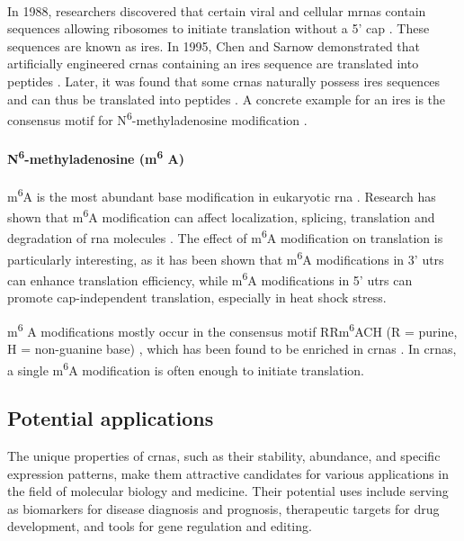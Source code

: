 \paragraph{} In 1988, researchers discovered that certain
viral and cellular \glspl{mrna} contain sequences allowing ribosomes to
initiate translation without a 5' cap \supercite{pelletier_internal_1988,
    jang_segment_1988}.
These sequences are known as \gls{ires}.
In 1995, Chen and Sarnow demonstrated that artificially engineered \glspl{crna}
containing an \gls{ires} sequence are translated into peptides
\supercite{chen_initiation_1995}.
Later, it was found that some \glspl{crna} naturally possess \gls{ires}
sequences and can thus be translated into peptides
\supercite{chen_expanding_2020,legnini_circ-znf609_2017,pamudurti_translation_2017}.
A concrete example for an \gls{ires} is the consensus motif for
N\textsuperscript{6}-methyladenosine modification
\supercite{yang_extensive_2017}.

\paragraph{N\textsuperscript{6}-methyladenosine (m\textsuperscript{6}
    A)}  m\textsuperscript{6}A is the most abundant base modification in eukaryotic
\gls{rna} \supercite{yang_extensive_2017,li_pivotal_2014,wei_methylated_1975}.
Research has shown that m\textsuperscript{6}A modification can affect
localization, splicing, translation and degradation of \gls{rna} molecules
\supercite{yue_rna_2015,meyer_dynamic_2014}.
The effect of m\textsuperscript{6}A modification on translation is particularly
interesting, as it has been shown that m\textsuperscript{6}A modifications in
3' \glspl{utr} can enhance translation
efficiency\supercite{wang_n6-methyladenosine_2015}, while m\textsuperscript{6}A
modifications in 5' \glspl{utr} can promote cap-independent translation,
especially in heat shock stress\supercite{zhou_dynamic_2015,meyer_5_2015}.

m\textsuperscript{6}
A modifications mostly occur in the consensus motif RRm\textsuperscript{6}ACH
(R = purine, H = non-guanine base)
\supercite{csepany_sequence_1990,harper_sequence_1990}, which has been found to
be enriched in \glspl{crna} \supercite{yang_extensive_2017}.
In \glspl{crna}, a single m\textsuperscript{6}A modification is often enough to
initiate translation\supercite{yang_extensive_2017}.

\subsection{Potential applications}
\label{sec:circrna_applications}
The unique properties of \glspl{crna}, such as their stability, abundance, and
specific expression patterns, make them attractive candidates for various
applications in the field of molecular biology and medicine.
Their potential uses include serving as biomarkers for disease diagnosis and
prognosis, therapeutic targets for drug development, and tools for gene
regulation and editing.

